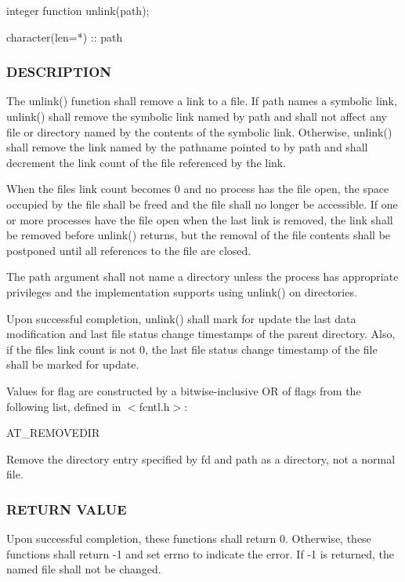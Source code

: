 \begin{DoxyVerb}integer function unlink(path);

 character(len=*) :: path
\end{DoxyVerb}


\subsubsection*{D\+E\+S\+C\+R\+I\+P\+T\+I\+ON}

The unlink() function shall remove a link to a file. If path names a symbolic link, unlink() shall remove the symbolic link named by path and shall not affect any file or directory named by the contents of the symbolic link. Otherwise, unlink() shall remove the link named by the pathname pointed to by path and shall decrement the link count of the file referenced by the link.

When the file\textquotesingle{}s link count becomes 0 and no process has the file open, the space occupied by the file shall be freed and the file shall no longer be accessible. If one or more processes have the file open when the last link is removed, the link shall be removed before unlink() returns, but the removal of the file contents shall be postponed until all references to the file are closed.

The path argument shall not name a directory unless the process has appropriate privileges and the implementation supports using unlink() on directories.

Upon successful completion, unlink() shall mark for update the last data modification and last file status change timestamps of the parent directory. Also, if the file\textquotesingle{}s link count is not 0, the last file status change timestamp of the file shall be marked for update.

Values for flag are constructed by a bitwise-\/inclusive OR of flags from the following list, defined in $<$fcntl.\+h$>$\+:

A\+T\+\_\+\+R\+E\+M\+O\+V\+E\+D\+IR

Remove the directory entry specified by fd and path as a directory, not a normal file.

\subsubsection*{R\+E\+T\+U\+RN V\+A\+L\+UE}

\begin{DoxyVerb}Upon successful completion, these functions shall return 0. Otherwise,
these functions shall return -1 and set  errno  to indicate the error. If
-1 is returned, the named file shall not be changed.
\end{DoxyVerb}


